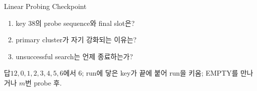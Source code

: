 \begin{frame}{Linear Probing Checkpoint}
\begin{enumerate}\item key 38의 probe sequence와 final slot은?\item primary cluster가 자기 강화되는 이유는?\item unsuccessful search는 언제 종료하는가?\end{enumerate}
\begin{exampleblock}{답}$12,0,1,2,3,4,5,6$에서 6; run에 닿은 key가 끝에 붙어 run을 키움; EMPTY를 만나거나 $m$번 probe 후.\end{exampleblock}
\end{frame}
